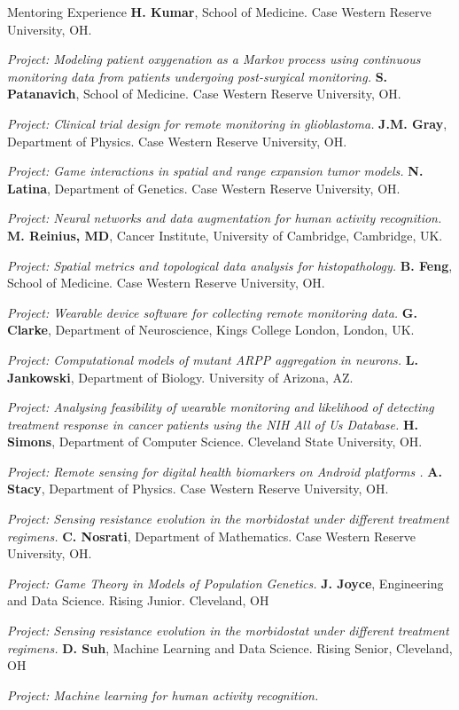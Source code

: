 \begin{rubric}{Mentoring Experience}
%
\entry*[2024-] \textbf{H. Kumar}, School of Medicine. Case Western Reserve University,  OH.
\par \textit{Project: Modeling patient oxygenation as a Markov process using continuous monitoring data from patients undergoing post-surgical monitoring.}
\entry*[2023-] \textbf{S. Patanavich}, School of Medicine. Case Western Reserve University,  OH.
\par \textit{Project: Clinical trial design for remote monitoring in glioblastoma.}
\entry*[2022-] \textbf{J.M. Gray}, Department of Physics. Case Western Reserve University, OH.\par
\textit{Project: Game interactions in spatial and range expansion tumor models.}
\entry*[2023-2024] \textbf{N. Latina}, Department of Genetics. Case Western Reserve University,  OH.
\par \textit{Project: Neural networks and data augmentation for human activity recognition.}
\entry*[2022-2024] \textbf{M. Reinius, MD}, Cancer Institute, University of Cambridge, Cambridge, UK.\par \textit{Project: Spatial metrics and topological data analysis for histopathology.}
\entry*[2022-2023] \textbf{B. Feng}, School of Medicine. Case Western Reserve University,  OH.
\par \textit{Project: Wearable device software for collecting remote monitoring data.}
\entry*[2022-2023] \textbf{G. Clarke}, Department of Neuroscience, Kings College London, London, UK. \par \textit{Project: Computational models of mutant ARPP aggregation in neurons.}
%
\entry*[2024-] \textbf{L. Jankowski}, Department of Biology. University of Arizona, AZ.
\par \textit{Project: Analysing feasibility of wearable monitoring and likelihood of detecting treatment response in cancer patients using the NIH All of Us Database.}
\entry*[2024-] \textbf{H. Simons}, Department of Computer Science. Cleveland State University, OH.
\par \textit{Project: Remote sensing for digital health biomarkers on Android platforms .}
\entry*[2024-] \textbf{A. Stacy}, Department of Physics. Case Western Reserve University,  OH.
\par \textit{Project: Sensing resistance evolution in the morbidostat under different treatment regimens.}
\entry*[2022-2023] \textbf{C. Nosrati}, Department of Mathematics. Case Western Reserve University,  OH.
\par \textit{Project: Game Theory in Models of Population Genetics.}
%
\entry*[2023-] \textbf{J. Joyce}, Engineering and Data Science. Rising Junior. Cleveland, OH
\par \textit{Project: Sensing resistance evolution in the morbidostat under different treatment regimens.}
\entry*[2022] \textbf{D. Suh}, Machine Learning and Data Science. Rising Senior, Cleveland, OH
\par \textit{Project: Machine learning for human activity recognition.}
\end{rubric}